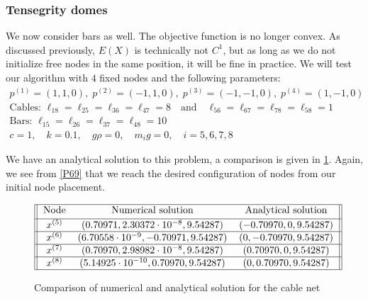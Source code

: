 \subsubsection{Tensegrity domes}
We now consider bars as well. The objective function is no longer convex. As discussed previously, $E(X)$ is technically not $C^1$, but as long as we do not initialize free nodes in the same position, it will be fine in practice. We will test our algorithm with $4$ fixed nodes and the following parameters:
\begin{equation*}
    \begin{gathered}
    p^{(1)} = (1,1,0),\; p^{(2)} = (-1,1,0),\; p^{(3)} = (-1,-1,0),\; p^{(4)} = (1,-1,0)\\
    \text{Cables: } \ell_{18} = \ell_{25} = \ell_{36} = \ell_{47} = 8 \quad\text{and} \quad  \ell_{56} = \ell_{67} = \ell_{78} = \ell_{58} = 1\\
    \text{Bars: }\ell_{15} = \ell_{26} = \ell_{37} = \ell_{48} = 10\\
    c=1, \quad k= 0.1, \quad g \rho = 0,\quad m_i g = 0, \quad i = 5,6,7,8
    \end{gathered}
\end{equation*}

We have an analytical solution to this problem, a comparison is given in \ref{P69Table}. Again, we see from \eqref{P69} that we reach the desired configuration of nodes from our initial node placement. 
\begin{figure}
\caption{Comparison of numerical and analytical solution for the cable net}
\begin{gather*}   
\begin{tabular}{||c c c||} 
 \hline
 Node & Numerical solution & Analytical solution \\ [0.5ex] 
 \hline
$x^{(5)}$ & $(0.70971,2.30372 \cdot 10^{-8},9.54287)$ & $(-0.70970,0,9.54287)$  \\ 
 \hline
 $x^{(6)}$ & $(6.70558 \cdot 10^{-9},-0.70971,9.54287)$& $(0,-0.70970,9.54287)$  \\ 
 \hline
 $x^{(7)}$ & $(0.70970,2.98982 \cdot 10^{-8},9.54287)$ & $(0.70970,0,9.54287)$\\ 
 \hline
 $x^{(8)}$ & $(5.14925 \cdot 10^{-10},0.70970,9.54287)$ & $(0,0.70970,9.54287)$ \\ 
 \hline
\end{tabular}
\end{gather*}
\label{P69Table}
\end{figure}

